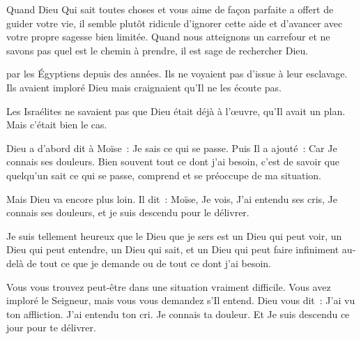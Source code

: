 
Quand Dieu \ocadr{}Qui sait toutes choses et vous aime de façon parfaite\fcadr{}
 a offert de guider votre vie, il semble plutôt ridicule d'ignorer
 cette aide et d'avancer avec votre propre sagesse bien limitée.
 Quand nous atteignons un carrefour et ne savons pas
 quel est le chemin à prendre, il est sage de rechercher Dieu. 

\dvrule






 par les Égyptiens depuis des années.
 Ils ne voyaient pas d'issue à leur esclavage.
 Ils avaient imploré Dieu mais craignaient qu'Il ne les écoute pas.


Les Israélites ne savaient pas que Dieu était déjà à l'œuvre,
 qu'Il avait un plan. Mais c'était bien le cas.

Dieu a d'abord dit à Moïse~: \og Je sais ce qui se passe. \fg{}
 Puis Il a ajouté~: \og Car Je connais ses douleurs. \fg{}
 Bien souvent tout ce dont j'ai besoin,
 c'est de savoir que quelqu'un sait ce qui se passe,
 comprend et se préoccupe de ma situation.

Mais Dieu va encore plus loin. Il dit~:
 \og Moïse, Je vois, J'ai entendu ses cris, Je connais ses douleurs,
 et je suis descendu pour le délivrer. \fg{}

Je suis tellement heureux que le Dieu que je sers est un Dieu qui peut voir,
 un Dieu qui peut entendre, un Dieu qui sait,
 et un Dieu qui peut faire infiniment au-delà
 de tout ce que je demande ou de tout ce dont j'ai besoin.

Vous vous trouvez peut-être dans une situation vraiment difficile.
 Vous avez imploré le Seigneur, mais vous vous demandez s'Il entend.
 Dieu vous dit~:
 \og J'ai vu ton affliction. J'ai entendu ton cri. Je connais ta douleur.
 Et Je suis descendu ce jour pour te délivrer. \fg{}

